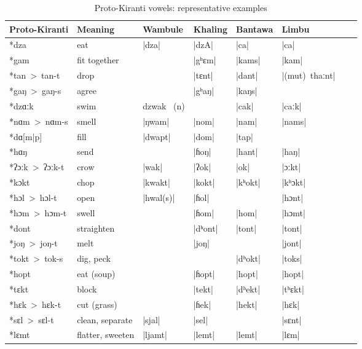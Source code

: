 \documentclass[oneside,a4paper,11pt]{article}
\newcommand{\ipa}[1]{{\phon\mbox{#1}}} %
\newcommand{\dhat}[1]{|\ipa{#1}|}
\begin{document}
 \begin{table}[H]
 \caption{Proto-Kiranti vowels: representative examples} \centering \label{tab:vowels.ex}
 \begin{tabular}{llllllll}
 \toprule
Proto-Kiranti & Meaning &Wambule & Khaling & Bantawa & Limbu \\
 \midrule
\ipa{*dza} &	eat &	\dhat{dza} &	\dhat{dzA} &	\dhat{ca} &	\dhat{ca} &	\\
\ipa{*gam} &	fit together &	&	\dhat{gʰɛm} &	\dhat{kams} &	\dhat{kam} &	\\
\ipa{*tan > tan-t} &	drop &	&	\dhat{tɛnt} &	\dhat{dant} &	\dhat{(mut) thaːnt} &	\\
\ipa{*gaŋ > gaŋ-s} &	agree &	&	\dhat{gʰaŋ} &	\dhat{kaŋs} &	&	\\
 \midrule						
\ipa{*dzɑːk} &	swim &	\ipa{dzwak } (n) &	&	\dhat{cak} &	\dhat{caːk} &	\\
\ipa{*nɑm > nɑm-s} &	smell &	\dhat{ŋwam} &	\dhat{nom} &	\dhat{nam} &	\dhat{nams} &	\\
\ipa{*dɑ[m|p]} &	fill &	\dhat{dwapt} &	\dhat{dom} &	\dhat{tap} &	&	\\
\ipa{*hɑŋ} &	send &	&	\dhat{ɦoŋ} &	\dhat{hant} &	\dhat{haŋ} &	\\
\midrule
\ipa{*ʔɔːk > ʔɔːk-t} &	crow &	\dhat{wak} &	\dhat{ʔok} &	\dhat{ok} &	\dhat{ɔːkt} &	\\
\ipa{*kɔkt} &	chop &	\dhat{kwakt} &	\dhat{kokt} &	\dhat{kʰokt} &	\dhat{kʰɔkt} &	\\
\ipa{*hɔl > hɔl-t} &	open &	\dhat{hwal(s)} &	\dhat{ɦol} &	&	\dhat{hɔnt} &	\\
\ipa{*hɔm > hɔm-t} &	swell &	&	\dhat{ɦom} &	\dhat{hom} &	\dhat{hɔmt} &	\\
\midrule
\ipa{*dont} &	straighten &	&	\dhat{dʰont} &	\dhat{tont} &	\dhat{tont} &	\\
\ipa{*joŋ > joŋ-t} &	melt &	&	\dhat{joŋ} &	&	\dhat{jont} &	\\
\ipa{*tokt > tok-s} &	dig, peck &	&	&	\dhat{dʰokt} &	\dhat{toks} &	\\
\ipa{*hopt} &	eat (soup) &	&	\dhat{ɦopt} &	\dhat{hopt} &	\dhat{hopt} &	\\
\midrule
\ipa{*tɛkt} &	block &	&	\dhat{tekt} &	\dhat{dʰekt} &	\dhat{tʰɛkt} &	\\
\ipa{*hɛk > hɛk-t} &	cut (grass) &	&	\dhat{ɦek} &	\dhat{hekt} &	\dhat{hɛk} &	\\
\ipa{*sɛl > sɛl-t} &	clean, separate &	\dhat{sjal} &	\dhat{sel} &	&	\dhat{sɛnt} &	\\
\ipa{*lɛmt} &	flatter, sweeten &	\dhat{ljamt} &	\dhat{lemt} &	\dhat{lemt} &	\dhat{lɛm} &	\\

\end{tabular}
\end{table}
\end{document}

